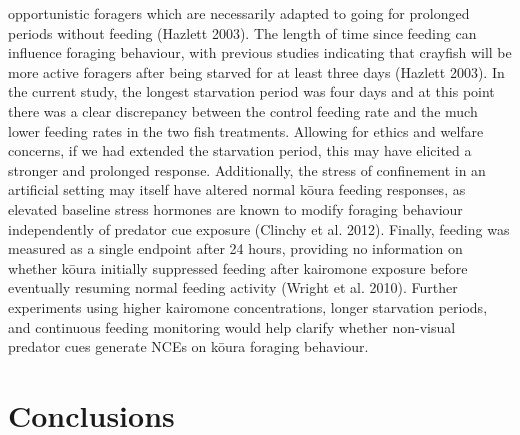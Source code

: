\documentclass[
  12pt,
  a4paper,
]{scrbook}
\begin{document}
opportunistic foragers which are necessarily adapted to going for
prolonged periods without feeding (Hazlett 2003). The length of time
since feeding can influence foraging behaviour, with previous studies
indicating that crayfish will be more active foragers after being
starved for at least three days (Hazlett 2003). In the current study,
the longest starvation period was four days and at this point there was
a clear discrepancy between the control feeding rate and the much lower
feeding rates in the two fish treatments. Allowing for ethics and
welfare concerns, if we had extended the starvation period, this may
have elicited a stronger and prolonged response. Additionally, the
stress of confinement in an artificial setting may itself have altered
normal kōura feeding responses, as elevated baseline stress hormones are
known to modify foraging behaviour independently of predator cue
exposure (Clinchy et al. 2012). Finally, feeding was measured as a
single endpoint after 24 hours, providing no information on whether
kōura initially suppressed feeding after kairomone exposure before
eventually resuming normal feeding activity (Wright et al. 2010).
Further experiments using higher kairomone concentrations, longer
starvation periods, and continuous feeding monitoring would help clarify
whether non-visual predator cues generate NCEs on kōura foraging
behaviour.

\section{Conclusions}\label{conclusions}
\end{document}
